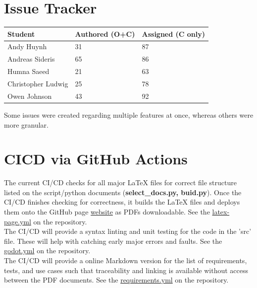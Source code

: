 \documentclass{article}
\begin{document}
\section{Issue Tracker}

\begin{table}[H]
\centering
\begin{tabular}{lll}
\toprule
\textbf{Student} & \textbf{Authored (O+C)} & \textbf{Assigned (C only)}\\
\midrule
Andy Huynh & 31 & 87 \\
Andreas Sideris & 65 & 86 \\
Humna Saeed & 21 & 63 \\
Christopher Ludwig & 25 & 78 \\
Owen Johnson & 43 & 92 \\
\bottomrule
\end{tabular}
\end{table}

\noindent Some issues were created regarding multiple features at once, whereas 
others were more granular. 

\section{CICD via GitHub Actions}


\noindent The current CI/CD checks for all major LaTeX files for correct file structure listed 
on the script/python documents (\textbf{select\_docs.py, buid.py}).
Once the CI/CD finishes checking for correctness, it builds the LaTeX files and deploys
them onto the GitHub page \href{https://aeolus-software.github.io/RealmForge/}{website} as PDFs downloadable.
See the \href{https://github.com/Aeolus-Software/RealmForge/blob/main/.github/workflows/latex-pages.yml}{latex-page.yml} on the repository.
\\
\noindent The CI/CD will provide a syntax linting and unit testing for the code in the 'src' file. These will 
help with catching early major errors and faults.
See the \href{https://github.com/Aeolus-Software/RealmForge/blob/main/.github/workflows/godot.yml}{godot.yml} on the repository.
\\
\noindent The CI/CD will provide a online Markdown version for the list of requirements, tests, and use cases such that
traceability and linking is available without access between the PDF documents. 
See the \href{https://github.com/Aeolus-Software/RealmForge/blob/main/.github/workflows/requirements.yml}{requirements.yml} on the repository.
\end{document}
